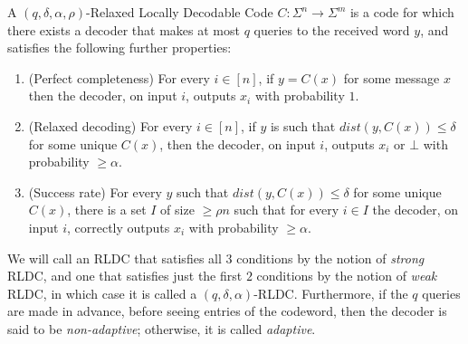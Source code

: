 \begin{definition}\label{def:strongRLDC} A $(q,\delta, \alpha, \rho)$-Relaxed Locally Decodable Code 
${C}: \Sigma^n \rightarrow \Sigma^m$ is a code for which there exists a decoder that makes at most $q$ queries to the received word $y$, and satisfies the following further properties:
\begin{enumerate} %
\item  (Perfect completeness) For every $i\in [n]$, if $y=C(x)$ for some message $x$ then the decoder, on input $i$, outputs $x_i$ with probability $1.$
\item  (Relaxed decoding) For every $i\in [n]$, if $y$ is such that $dist(y, C(x))\leq \delta $ for some unique $C(x)$, then the decoder, on input $i$, outputs $x_i$ or $\bot$ with probability   $\geq \alpha$. %
\item (Success rate) For every $y$ such that $dist(y, C(x))\leq \delta $ for some unique $C(x)$, there is a set $I$ of size $\geq \rho n$ such that for every $i\in I$ the decoder, on input $i$, correctly outputs $x_i$ with probability $\geq \alpha$. %
\end{enumerate}
We will call an RLDC that satisfies all $3$ conditions by the notion of {\em strong} RLDC, and one that satisfies just the first $2$ conditions by the notion of {\em weak} RLDC, in which case it is called a $(q,\delta, \alpha)$-RLDC. Furthermore,  if the $q$ queries are made in advance, before seeing entries of the codeword, then the decoder is said to be {\em non-adaptive}; otherwise, it is called {\em adaptive}.
\end{definition}





